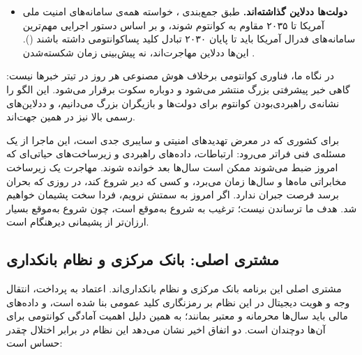 \documentclass[a4paper,12pt]{article}
\begin{document}
\begin{itemize}[rightmargin=0.5cm, itemsep=5pt]
		\item \textbf{دولت‌ها ددلاین گذاشته‌اند.}
		طبق جمع‌بندی ،  خواسته همه‌ی سامانه‌های امنیت ملی آمریکا تا ۲۰۳۵ مقاوم به کوانتوم شوند،
		و بر اساس دستور اجرایی  مهم‌ترین سامانه‌های فدرال آمریکا باید تا پایان ۲۰۳۰ تبادل کلید پساکوانتومی داشته باشند
		(\href{https://qdayiscoming.com/articles/post-quantum-deadlines}{}).
		این‌ها ددلاین مهاجرت‌اند، نه پیش‌بینی زمان شکسته‌شدن .
	\end{itemize}

	در نگاه ما، فناوری کوانتومی برخلاف هوش مصنوعی هر روز در تیتر خبرها نیست: گاهی خبر پیشرفتی بزرگ منتشر می‌شود و دوباره سکوت برقرار می‌شود.
	این الگو را نشانه‌ی راهبردی‌بودن کوانتوم برای دولت‌ها و بازیگران بزرگ می‌دانیم، و ددلاین‌های رسمی بالا نیز در همین جهت‌اند.

	برای کشوری که در معرض تهدیدهای امنیتی و سایبری جدی است، این ماجرا از یک مسئله‌ی فنی فراتر می‌رود:
	ارتباطات، داده‌های راهبردی و زیرساخت‌های حیاتی‌ای که امروز ضبط می‌شوند ممکن است سال‌ها بعد خوانده شوند.
	مهاجرت یک زیرساخت مخابراتی ماه‌ها و سال‌ها زمان می‌برد، و کسی که دیر شروع کند، در روزی که بحران برسد فرصت جبران ندارد.
	اگر امروز به سمتش نرویم، فردا سخت پشیمان خواهیم شد.
	هدف ما ترساندن نیست؛ ترغیب به شروع به‌موقع است، چون شروع به‌موقع بسیار ارزان‌تر از پشیمانی دیرهنگام است.

	\subsection*{مشتری اصلی: بانک مرکزی و نظام بانکداری}
	مشتری اصلی این برنامه بانک مرکزی و نظام بانکداری‌اند. اعتماد به پرداخت، انتقال وجه و هویت دیجیتال در این نظام بر رمزنگاری کلید عمومی بنا شده است،
	و داده‌های مالی باید سال‌ها محرمانه و معتبر بمانند؛ به همین دلیل اهمیت آمادگی کوانتومی برای آن‌ها دوچندان است.
	دو اتفاق اخیر نشان می‌دهد این نظام در برابر اختلال چقدر حساس است:
\end{document}

